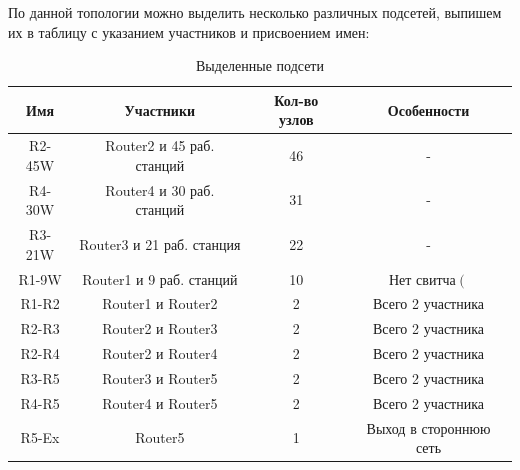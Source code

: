 \documentclass[a4paper]{article}
\begin{document}
  По данной топологии можно выделить несколько различных подсетей, выпишем их в 
  таблицу с указанием участников и присвоением имен:
  \begin{table}[H]
    \centering
    \begin{tabular}{| c | c | c | c |}
      \hline
      Имя & Участники & Кол-во узлов & Особенности \\
      \hline
      R2-45W & Router2 и 45 раб. станций & 46 & - \\
      \hline
      R4-30W & Router4 и 30 раб. станций & 31 & - \\
      \hline
      R3-21W & Router3 и 21 раб. станция & 22 & - \\
      \hline
      R1-9W & Router1 и 9 раб. станций & 10 & Нет свитча$\left(\right.$ \\
      \hline
      R1-R2 & Router1 и Router2 & 2 & Всего 2 участника \\
      \hline
      R2-R3 & Router2 и Router3 & 2 & Всего 2 участника \\
      \hline
      R2-R4 & Router2 и Router4 & 2 & Всего 2 участника \\
      \hline
      R3-R5 & Router3 и Router5 & 2 & Всего 2 участника \\
      \hline
      R4-R5 & Router4 и Router5 & 2 & Всего 2 участника \\
      \hline
      R5-Ex & Router5 & 1 & Выход в стороннюю сеть \\      
      \hline
    \end{tabular}
    \caption{Выделенные подсети}
  \end{table}
\end{document}
